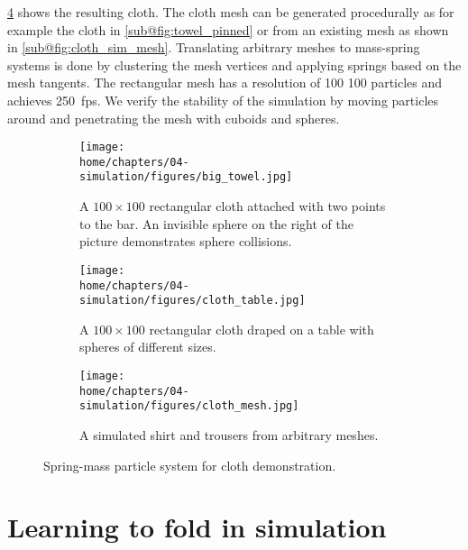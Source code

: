 \documentclass[\home/main.tex]{subfiles}
\begin{document}
\cref{fig:cloth_sim_result} shows the resulting cloth. The cloth mesh can be generated procedurally as for example the cloth in \cref{sub@fig:towel_pinned} or from an existing mesh as shown in \cref{sub@fig:cloth_sim_mesh}. Translating arbitrary meshes to mass-spring systems is done by clustering the mesh vertices and applying springs based on the mesh tangents. The rectangular mesh has a resolution of 100\,\texttimes\,100 particles and achieves \qty{250}{fps}. We verify the stability of the simulation by moving particles around and penetrating the mesh with cuboids and spheres.

\begin{figure}[htpb]{}
    \centering
    \begin{subfigure}[b]{0.95\textwidth}
        \centering
        \texttt{[image: \\home/chapters/04-simulation/figures/big\_towel.jpg]}
        \caption[Simulated, pinned rectangular cloth.]{A $100 \times 100$ rectangular cloth attached with two points to the bar. An invisible sphere on the right of the picture demonstrates sphere collisions.}
        \label{fig:towel_pinned}
    \end{subfigure}
    \begin{subfigure}[b]{0.95\textwidth}
        \centering
        \texttt{[image: \\home/chapters/04-simulation/figures/cloth\_table.jpg]}
        \caption[Simulated rectangular cloth on table.]{A $100 \times 100$ rectangular cloth draped on a table with spheres of different sizes.}
        \label{fig:towel_table}
    \end{subfigure}
    \begin{subfigure}[b]{0.95\textwidth}
        \centering
        \texttt{[image: \\home/chapters/04-simulation/figures/cloth\_mesh.jpg]}
        \caption[Simulated cloth meshes.]{A simulated shirt and trousers from arbitrary meshes.}
        \label{fig:cloth_sim_mesh}
    \end{subfigure}

    \caption[Spring-mass particle system for cloth demonstration.]{Spring-mass particle system for cloth demonstration.}
    \label{fig:cloth_sim_result}
\end{figure}

\section{Learning to fold in simulation}
\end{document}
